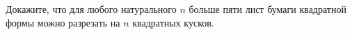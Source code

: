 \documentclass{article}
\begin{document}
Докажите, что для любого натурального $n$ больше пяти лист бумаги квадратной формы можно разрезать на $n$ квадратных кусков.
\end{document}
